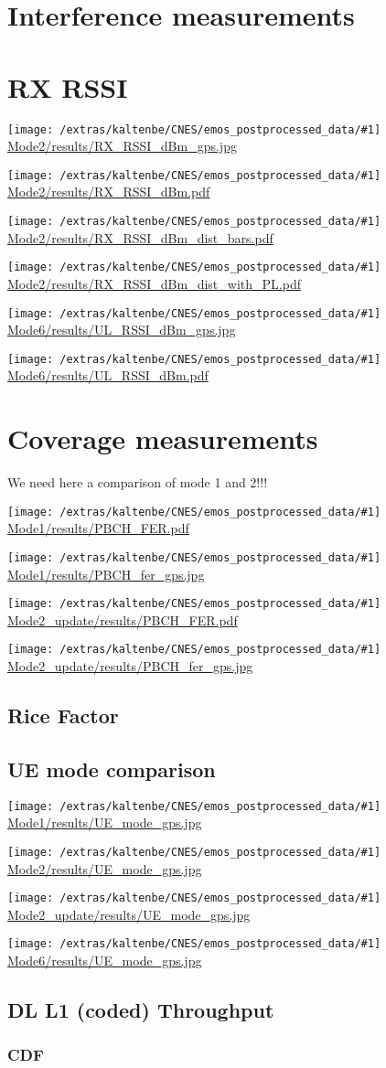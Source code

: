 \documentclass[a4paper,10pt]{article}
\newcommand{\printfile}[1]{
 \begin{minipage}{8cm}
  \centering
  \texttt{[image: /extras/kaltenbe/CNES/emos\_postprocessed\_data/\#1]}
  \url{#1}

 \end{minipage}
}
\begin{document}
\section{Interference measurements}


\section{RX RSSI}
\printfile{Mode2/results/RX_RSSI_dBm_gps.jpg}
\printfile{Mode2/results/RX_RSSI_dBm.pdf}

\printfile{Mode2/results/RX_RSSI_dBm_dist_bars.pdf}
\printfile{Mode2/results/RX_RSSI_dBm_dist_with_PL.pdf}

\printfile{Mode6/results/UL_RSSI_dBm_gps.jpg}
\printfile{Mode6/results/UL_RSSI_dBm.pdf}


\section{Coverage measurements}
We need here a comparison of mode 1 and 2!!!

\printfile{Mode1/results/PBCH_FER.pdf}
\printfile{Mode1/results/PBCH_fer_gps.jpg}

\printfile{Mode2_update/results/PBCH_FER.pdf}
\printfile{Mode2_update/results/PBCH_fer_gps.jpg}


\subsection{Rice Factor}


\subsection{UE mode comparison}
\printfile{Mode1/results/UE_mode_gps.jpg}
\printfile{Mode2/results/UE_mode_gps.jpg}

\printfile{Mode2_update/results/UE_mode_gps.jpg}
\printfile{Mode6/results/UE_mode_gps.jpg}

\subsection{DL L1 (coded) Throughput}

\subsubsection{CDF}
\end{document}
